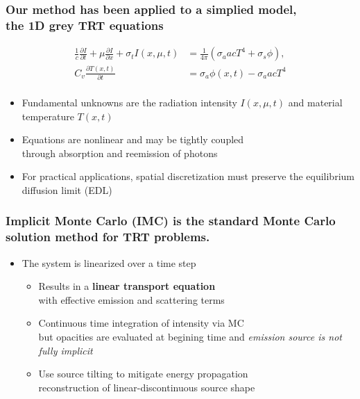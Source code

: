 \documentclass[xcolor=dvipsnames,hyperref={pdfpagelabels=false},unknownkeysallowed]{beamer}
\newcommand{\colb}[1]{{\color{blue} #1}}
\newcommand{\colG}[1]{{\color{Gray} #1}}
\newlength{\wideitemsep}
\let\olditem\item
\renewcommand{\item}{\setlength{\itemsep}{\wideitemsep}\olditem}
\newcommand{\pderiv}[2]{\frac{\partial #1}{\partial #2}}
\begin{document}
\begin{frame}
\frametitle{Our method has been applied to a simplied model, \\ the 1D grey TRT equations}
\setlength{\unitlength}{\textwidth}
\begin{center}
\begin{align*}\label{ho_cont}
    \frac{1}{c}\pderiv{I}{t} + \mu \pderiv{I}{x} + \sigma_t I(x,\mu,t)
    &= \frac{1}{4\pi} \left( \sigma_a a c T^4 + \sigma_s \phi\right),
  \\
  C_v \pderiv{T(x,t)}{t} &=  \sigma_a \phi(x,t) - \sigma_a a c T^4\\
\end{align*}
\end{center}
\begin{itemize}
        \item Fundamental unknowns are the radiation intensity $I(x,\mu,t)$ and material
            temperature $T(x,t)$
        \item Equations are nonlinear and may be tightly coupled \\  
               \colG{through absorption and reemission of photons}
        \item For practical applications, spatial discretization must preserve the \colb{equilibrium diffusion limit} (EDL)
\end{itemize}
\end{frame}

\begin{frame}
\frametitle{Implicit Monte Carlo (IMC) is the standard Monte Carlo solution method for TRT problems.}
\begin{itemize}
\item[] The system is linearized over a time step \vspace{0.1in}
\setlength\wideitemsep{0.2in}
    \begin{itemize}
        \item Results in a \textbf{linear transport equation }
               \\ \colG{with effective emission and scattering terms}
\item Continuous time integration of intensity via MC
        \\ \colG{but opacities are evaluated at begining time and \emph{emission source is not fully implicit}}
        \item Use source tilting to mitigate energy propagation \\
            \colG{reconstruction of linear-discontinuous source shape}
    \end{itemize}
\end{itemize}
\end{frame}
\end{document}
